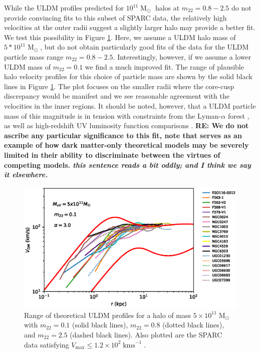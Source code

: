 \documentclass[a4paper,11pt]{article}
\newcommand{\re}[1]{{{\bf \color{green} RE: #1}}}
\begin{document}
While the ULDM profiles predicted for $10^{11}\operatorname{M}_{\odot}$ halos at $m_{22} = 0.8 - 2.5$ do not provide convincing fits to this subset of SPARC data, the relatively high velocities at the outer radii suggest a slightly larger halo may provide a better fit. We test this possibility in Figure \ref{fig:velocity_23}. Here, we assume a ULDM halo mass of $5*10^{11}\operatorname{M}_{\odot}$, but do not obtain particularly good fits of the data for the ULDM particle mass range $m_{22} = 0.8 - 2.5$. Interestingly, however, if we assume a lower ULDM mass of $m_{22} = 0.1$ we find a much improved fit. The range of plausible halo velocity profiles for this choice of particle mass are shown by the solid black lines in Figure \ref{fig:velocity_23}. The plot focuses on the smaller radii where the core-cusp discrepancy would be manifest and we see reasonable agreement with the velocities in the inner regions. It should be noted, however, that a ULDM particle mass of this magnitude is in tension with constraints from the Lyman-$\alpha$ forest \cite{Amendola:2005ad}, as well as high-redshift UV luminosity function comparisons \cite{Bozek:2014uqa}.  \re{ We do not ascribe any particular significance to this fit,  note that  serves as an example of how dark matter-only theoretical models may be severely limited in their ability to discriminate between the virtues of competing models. {\em this sentence reads a bit oddly; and I think we say it elsewhere.}}

\begin{figure}
\centering
\includegraphics[scale = 0.8, trim={0cm 2.5cm 1cm 0.35cm}]{pics/best_match.eps} 
\caption{Range of theoretical ULDM profiles for a halo of mass $5\times 10^{11}\operatorname{M}_{\odot}$ with $m_{22} = 0.1$ (solid black lines), $m_{22} = 0.8$ (dotted black lines), and $m_{22} = 2.5$ (dashed black lines). Also plotted are the SPARC data satisfying $V_{\mathrm{max}}\leq 1.2\times 10^2 \operatorname{kms}^{-1}$. }\label{fig:velocity_23}
\end{figure}
\end{document}
